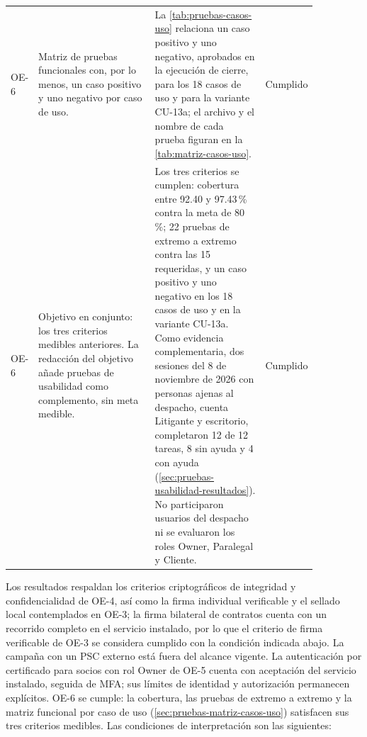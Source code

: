 \begin{longtable}{@{}l L{0.38\linewidth} L{0.36\linewidth} L{0.12\linewidth}@{}}
  \addlinespace
  OE-6 & Matriz de pruebas funcionales con, por lo menos, un caso positivo y uno negativo por caso de uso. & La \cref{tab:pruebas-casos-uso} relaciona un caso positivo y uno negativo, aprobados en la ejecución de cierre, para los 18 casos de uso y para la variante CU-13a; el archivo y el nombre de cada prueba figuran en la \cref{tab:matriz-casos-uso}. & Cumplido \\
  \addlinespace
  OE-6 & Objetivo en conjunto: los tres criterios medibles anteriores. La redacción del objetivo añade pruebas de usabilidad como complemento, sin meta medible. & Los tres criterios se cumplen: cobertura entre 92.40 y 97.43\,\% contra la meta de 80\,\%; 22 pruebas de extremo a extremo contra las 15 requeridas, y un caso positivo y uno negativo en los 18 casos de uso y en la variante CU-13a. Como evidencia complementaria, dos sesiones del 8 de noviembre de 2026 con personas ajenas al despacho, cuenta Litigante y escritorio, completaron 12 de 12 tareas, 8 sin ayuda y 4 con ayuda (\cref{sec:pruebas-usabilidad-resultados}). No participaron usuarios del despacho ni se evaluaron los roles Owner, Paralegal y Cliente. & Cumplido \\
\end{longtable}

Los resultados respaldan los criterios criptográficos de integridad y confidencialidad de OE-4, así como la firma individual verificable y el sellado local contemplados en OE-3; la firma bilateral de contratos cuenta con un recorrido completo en el servicio instalado, por lo que el criterio de firma verificable de OE-3 se considera cumplido con la condición indicada abajo. La campaña con un PSC externo está fuera del alcance vigente. La autenticación por certificado para socios con rol Owner de OE-5 cuenta con aceptación del servicio instalado, seguida de MFA; sus límites de identidad y autorización permanecen explícitos. OE-6 se cumple: la cobertura, las pruebas de extremo a extremo y la matriz funcional por caso de uso (\cref{sec:pruebas-matriz-casos-uso}) satisfacen sus tres criterios medibles. Las condiciones de interpretación son las siguientes:

